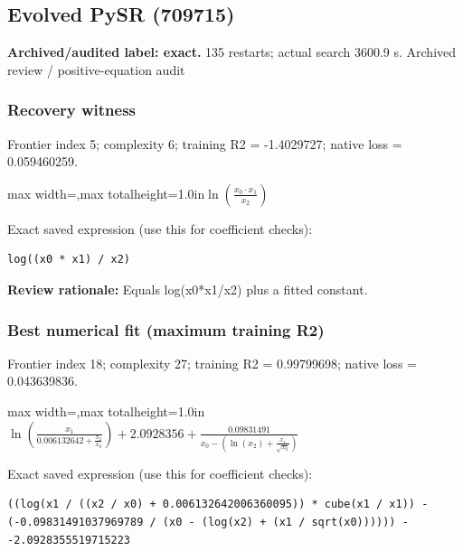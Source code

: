 \documentclass[10pt,letterpaper,landscape]{article}
\begin{document}
\begin{minipage}[t]{0.485\textwidth}
\subsection*{Evolved PySR (709715)}
\textbf{Archived/audited label: exact.} 135 restarts; actual search 3600.9 s.
{\small Archived review / positive-equation audit}
\subsubsection*{Recovery witness}
Frontier index 5; complexity 6; training R2 = -1.4029727; native loss = 0.059460259.
\begin{center}\begin{adjustbox}{max width=\linewidth,max totalheight=1.0in}$\displaystyle \ln{\left(\frac{x_{0} \cdot x_{1}}{x_{2}} \right)}$\end{adjustbox}\end{center}
{\scriptsize Exact saved expression (use this for coefficient checks):}
\begin{lstlisting}
log((x0 * x1) / x2)
\end{lstlisting}
{\small\textbf{Review rationale:} Equals log(x0*x1/x2) plus a fitted constant.}
\subsubsection*{Best numerical fit (maximum training R2)}
Frontier index 18; complexity 27; training R2 = 0.99799698; native loss = 0.043639836.
\begin{center}\begin{adjustbox}{max width=\linewidth,max totalheight=1.0in}$\displaystyle \ln{\left(\frac{x_{1}}{0.006132642 + \frac{x_{2}}{x_{0}}} \right)} + 2.0928356 + \frac{0.09831491}{x_{0} - \left(\ln{\left(x_{2} \right)} + \frac{x_{1}}{\sqrt{x_{0}}}\right)}$\end{adjustbox}\end{center}
{\scriptsize Exact saved expression (use this for coefficient checks):}
\begin{lstlisting}
((log(x1 / ((x2 / x0) + 0.006132642006360095)) * cube(x1 / x1)) - (-0.09831491037969789 / (x0 - (log(x2) + (x1 / sqrt(x0)))))) - -2.0928355519715223
\end{lstlisting}
\end{minipage}
\clearpage{}\label{ideal_gas-10008}
\end{document}
